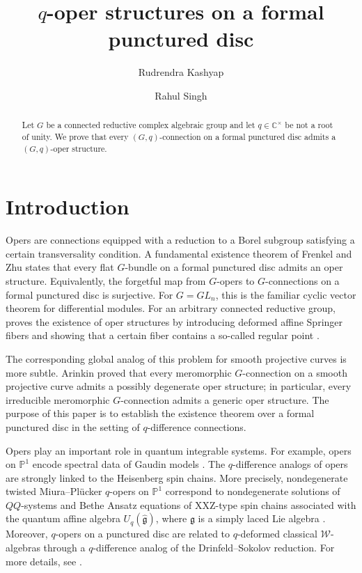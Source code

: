 \documentclass[11pt]{amsart}
\title{$q$-oper structures 
on a formal punctured disc}
\author{Rudrendra Kashyap}
\author{Rahul Singh}
\numberwithin{equation}{section}
\theoremstyle{definition}
\theoremstyle{remark}
\begin{document}
\begin{abstract}
Let $G$ be a connected reductive complex algebraic group and let
$q\in\mathbb{C}^{\times}$ be not a root of unity. We prove that every $(G,q)$-connection on a formal punctured disc admits a $(G,q)$-oper structure.
\end{abstract}

\maketitle
\setcounter{tocdepth}{1}
\tableofcontents
\section{Introduction}
Opers are connections equipped with a reduction to a Borel subgroup satisfying a certain transversality condition. A fundamental existence theorem of Frenkel and Zhu \cite{FZ} states that every flat $G$-bundle on a formal punctured disc admits an oper structure. Equivalently, the forgetful map from $G$-opers to $G$-connections on a formal punctured disc is surjective. For $G=GL_n$, this is the familiar cyclic vector theorem \cite[Lemme~1.3]{Del} for differential modules. For an arbitrary connected reductive group, \cite{FZ} proves the existence of oper structures by introducing deformed affine Springer fibers and showing that a certain fiber contains a so-called regular point \cite[Theorem~4]{FZ}.

The corresponding global analog of this problem for smooth projective curves is more subtle. Arinkin \cite{Ar} proved that every meromorphic $G$-connection on a
smooth projective curve admits a possibly degenerate oper structure; in particular, every irreducible meromorphic $G$-connection admits a generic oper structure. The purpose of this paper is to establish the existence theorem over a formal punctured disc in the setting of $q$-difference connections. 


Opers play an important role in quantum integrable systems. For example, opers on $\mathbb{P}^1$ encode spectral data of Gaudin models \cite{FFR,FFT,Fre}. The $q$-difference analogs of opers are strongly linked to the Heisenberg spin chains. More precisely, nondegenerate twisted Miura--Pl\"ucker $q$-opers on $\mathbb{P}^1$ correspond to nondegenerate solutions of $QQ$-systems and Bethe Ansatz equations of XXZ-type spin chains associated with the quantum affine algebra $U_{q}(\hat{\mathfrak{g}})$, where $\mathfrak{g}$ is a simply laced Lie algebra \cite{FKSZ}. Moreover, $q$-opers on a punctured disc are related to $q$-deformed classical $\mathcal W$-algebras through a $q$-difference analog of the Drinfeld--Sokolov reduction. For more details, see \cite{FRS,SS}.
\end{document}
